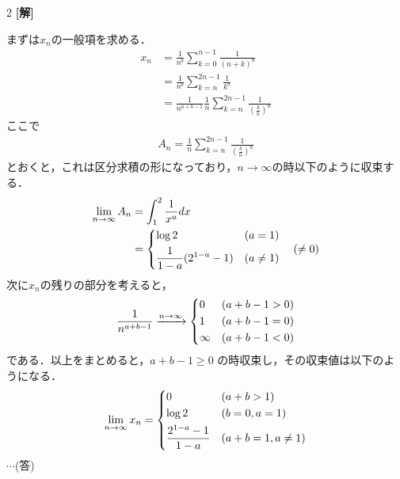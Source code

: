 \documentclass[../../main.tex]{subfiles}
\begin{document}
\setcounter{equation}{0}
\setcounter{figure}{0}
\setcounter{table}{0}
\begin{oframed}
  
\end{oframed}
\setlength{\columnseprule}{0.4pt}
\begin{multicols}{2}
  {\bf[解]}

  まずは$x_n$の一般項を求める．
  \begin{align*}
    x_n
     & = \frac{1}{n^{b}} \sum_{k=0}^{n-1} \frac{1}{(n+k)^a}                                    \\
     & = \frac{1}{n^{b}} \sum_{k=n}^{2n-1} \frac{1}{k^a}                                       \\
     & = \frac{1}{n^{a+b-1}} \frac{1}{n}\sum_{k=n}^{2n-1} \frac{1}{\left(\frac{k}{n}\right)^a}
  \end{align*}
  ここで
  \begin{align*}
    A_n = \frac{1}{n}\sum_{k=n}^{2n-1} \frac{1}{\left(\frac{k}{n}\right)^a}
  \end{align*}
  とおくと，これは区分求積の形になっており，$n\to\infty$の時以下のように収束する．
  \begin{align*}
    \lim_{n\to\infty} A_n
     & = \int_1^2 \frac{1}{x^a} dx \\
     & =
    \begin{dcases}
      \log 2                   & (a=1)     \\
      \frac{1}{1-a}(2^{1-a}-1) & (a \ne 1)
    \end{dcases} \quad (\ne 0)
  \end{align*}
  次に$x_n$の残りの部分を考えると，
  \begin{align*}
    \frac{1}{n^{a+b-1}} \xrightarrow{n \to \infty}
    \begin{dcases}
      0      & (a+b-1 > 0) \\
      1      & (a+b-1 = 0) \\
      \infty & (a+b-1 < 0)
    \end{dcases}
  \end{align*}
  である．以上をまとめると，$a+b-1 \ge 0$ の時収束し，その収束値は以下のようになる．
  \begin{align*}
    \lim_{n\to\infty} x_n =
    \begin{dcases}
      0                     & (a+b>1)          \\
      \log 2                & (b=0, a=1)       \\
      \frac{2^{1-a}-1}{1-a} & (a+b=1, a \ne 1)
    \end{dcases}
  \end{align*}
  $\cdots$(答)


\end{multicols}
\end{document}
